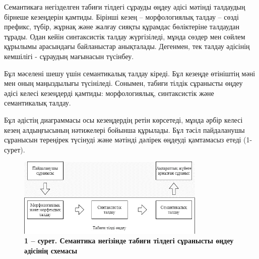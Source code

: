 \begin{multicols}{2}
Семантикаға негізделген табиғи тілдегі сұрауды өңдеу әдісі мәтінді
талдаудың бірнеше кезеңдерін қамтиды. Бірінші кезең -- морфологиялық
талдау -- сөзді префикс, түбір, жұрнақ және жалғау сияқты құрамдас
бөліктеріне талдаудан тұрады. Одан кейін синтаксистік талдау
жүргізіледі, мұнда сөздер мен сөйлем құрылымы арасындағы байланыстар
анықталады. Дегенмен, тек талдау әдісінің кемшілігі - сұраудың мағынасын
түсінбеу.

Бұл мәселені шешу үшін семантикалық талдау кіреді. Бұл кезеңде өтініштің
мәні мен оның маңыздылығы түсініледі. Сонымен, табиғи тілдік сұранысты
өңдеу әдісі келесі кезеңдерді қамтиды: морфологиялық, синтаксистік және
семантикалық талдау.

Бұл әдістің диаграммасы осы кезеңдердің ретін көрсетеді, мұнда әрбір
келесі кезең алдыңғысының нәтижелері бойынша құрылады. Бұл тәсіл
пайдаланушы сұранысын тереңірек түсінуді және мәтінді дәлірек өңдеуді
қамтамасыз етеді (1-сурет).
\end{multicols}


\begin{figure}[H]
	\centering
	\includegraphics[width=0.8\textwidth]{assets/142}
	\caption*{\bfseries 1 -- сурет. Семантика негізінде табиғи тілдегі сұранысты өңдеу
  әдісінің схемасы}
\end{figure}

